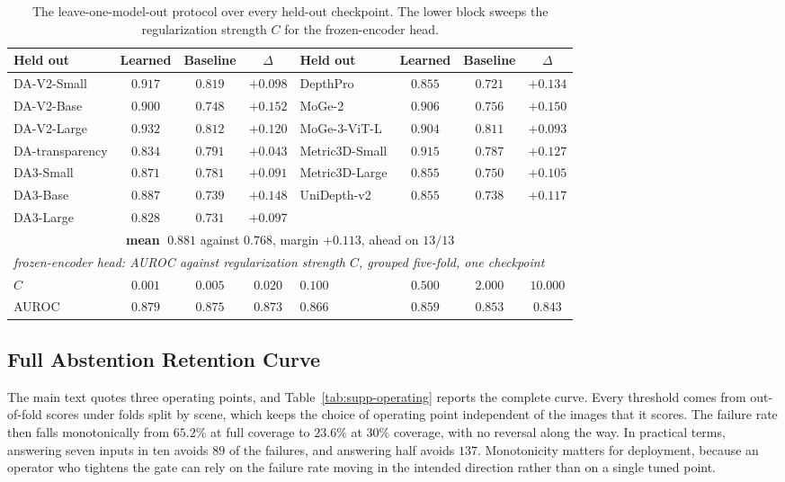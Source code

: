 \documentclass{article} %
\theoremstyle{defstyle}
\theoremstyle{plain}
\begin{document}
\begin{table}[htb]
\caption{The leave-one-model-out protocol over every held-out checkpoint. The lower block sweeps the regularization strength $C$ for the frozen-encoder head.}
\label{tab:supp-lomo}
\begin{center}
\scriptsize \setlength{\tabcolsep}{3pt}
\begin{tabular}{lccc|lccc}
\toprule
\textbf{Held out} & \textbf{Learned} & \textbf{Baseline} & \textbf{$\Delta$} &
\textbf{Held out} & \textbf{Learned} & \textbf{Baseline} & \textbf{$\Delta$} \\
\midrule
DA-V2-Small     & $0.917$ & $0.819$ & $+0.098$ & DepthPro       & $0.855$ & $0.721$ & $+0.134$ \\
DA-V2-Base      & $0.900$ & $0.748$ & $+0.152$ & MoGe-2         & $0.906$ & $0.756$ & $+0.150$ \\
DA-V2-Large     & $0.932$ & $0.812$ & $+0.120$ & MoGe-3-ViT-L   & $0.904$ & $0.811$ & $+0.093$ \\
DA-transparency & $0.834$ & $0.791$ & $+0.043$ & Metric3D-Small & $0.915$ & $0.787$ & $+0.127$ \\
DA3-Small       & $0.871$ & $0.781$ & $+0.091$ & Metric3D-Large & $0.855$ & $0.750$ & $+0.105$ \\
DA3-Base        & $0.887$ & $0.739$ & $+0.148$ & UniDepth-v2    & $0.855$ & $0.738$ & $+0.117$ \\
DA3-Large       & $0.828$ & $0.731$ & $+0.097$ & & &  \\
\midrule
\multicolumn{8}{c}{\textbf{mean} $\;0.881$ against $0.768$, margin $+0.113$, ahead on $13/13$} \\
\midrule
\multicolumn{8}{l}{\emph{frozen-encoder head: AUROC against regularization strength $C$, grouped five-fold, one checkpoint}} \\
$C$ & $0.001$ & $0.005$ & $0.020$ & $0.100$ & $0.500$ & $2.000$ & $10.000$ \\
AUROC & $\mathbf{0.879}$ & $0.875$ & $0.873$ & $0.866$ & $0.859$ & $0.853$ & $0.843$ \\
\bottomrule
\end{tabular}
\end{center}
\end{table}

\subsection{Full Abstention Retention Curve}
\label{sec:supp-operating}

The main text quotes three operating points, and Table~\ref{tab:supp-operating} reports the
complete curve. Every threshold comes from out-of-fold scores under folds split by scene, which
keeps the choice of operating point independent of the images that it scores. The failure rate
then falls monotonically from $65.2\%$ at full coverage to $23.6\%$ at $30\%$ coverage, with no
reversal along the way. In practical terms, answering seven inputs in ten avoids $89$ of the
failures, and answering half avoids $137$. Monotonicity matters for deployment, because an
operator who tightens the gate can rely on the failure rate moving in the intended direction
rather than on a single tuned point.
\end{document}
